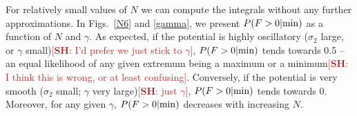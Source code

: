 \documentclass[12pt]{article}
\newcommand{\SH}[1]{\textcolor{brown}{[{\bf SH}: #1]}}
\begin{document}
For relatively small values of $N$ we can compute the integrals without any further approximations.   In Figs.~\ref{N6} and \ref{gamma}, we present $P(F>0|{\rm min})$ as a function of $N$ and $\gamma$. As expected, if the potential is highly oscillatory ($\sigma_2$ large, or $\gamma$ small)\SH{I'd prefer we just stick to $\gamma$}, $P(F>0|{\rm min})$  tends towards 0.5 --  an equal likelihood of any given extremum being a maximum or a minimum\SH{I think this is wrong, or at least confusing}. Conversely, if the potential is very smooth ($\sigma_2$ small; $\gamma$ very large)\SH{just $\gamma$}, $P(F>0|{\rm min})$  tends towards 0. Moreover, for any given $\gamma$, $P(F>0|{\rm min})$ decreases with increasing $N$. 
 
\end{document}
